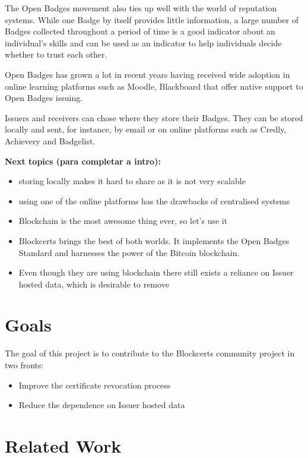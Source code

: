 \documentclass[llncsdoc]{llncs}
\begin{document}
The Open Badges movement also ties up well with the world of reputation systems. While one Badge by itself provides little information, a large number of Badges collected throughout a period of time is a good indicator about an individual's skills and can be used as an indicator to help individuals decide whether to trust each other.

Open Badges has grown a lot in recent years having received wide adoption in online learning platforms such as Moodle, Blackboard that offer native support to Open Badges issuing.

Issuers and receivers can chose where they store their Badges. They can be stored locally and sent, for instance, by email or on online platforms such as Credly, Achievery and Badgelist.

\textbf{Next topics (para completar a intro):}
\begin{itemize}
    \item storing locally makes it hard to share as it is not very scalable
    \item using one of the online platforms has the drawbacks of centralised systems
    \item Blockchain is the most awesome thing ever, so let's use it
    \item Blockcerts brings the best of both worlds. It implements the Open Badges Standard and harnesses the power of the Bitcoin blockchain.
    \item Even though they are using blockchain there still exists a reliance on Issuer hosted data, which is desirable to remove
\end{itemize}


\section{Goals}
\label{sec:goals}

The goal of this project is to contribute to the Blockcerts community project in two fronts:
 
\begin{itemize}
    \item Improve the certificate revocation process
    \item Reduce the dependence on Issuer hosted data
\end{itemize} 
 

\section{Related Work}
\end{document}
